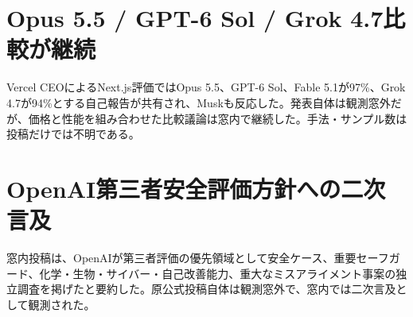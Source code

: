 \section{Opus 5.5 / GPT-6 Sol / Grok 4.7比較が継続}
Vercel CEOによるNext.js評価ではOpus 5.5、GPT-6 Sol、Fable 5.1が97\%、Grok 4.7が94\%とする自己報告が共有され、Muskも反応した。発表自体は観測窓外だが、価格と性能を組み合わせた比較議論は窓内で継続した。手法・サンプル数は投稿だけでは不明である。

\section{OpenAI第三者安全評価方針への二次言及}
窓内投稿は、OpenAIが第三者評価の優先領域として安全ケース、重要セーフガード、化学・生物・サイバー・自己改善能力、重大なミスアライメント事案の独立調査を掲げたと要約した。原公式投稿自体は観測窓外で、窓内では二次言及として観測された。
